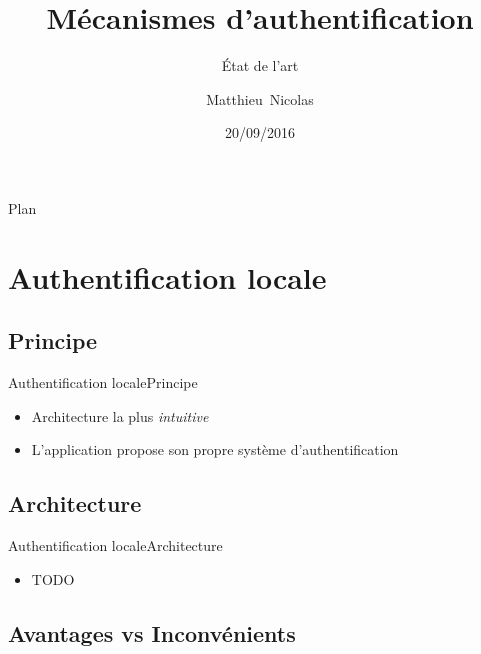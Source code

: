 \documentclass{beamer}
\title{Mécanismes d'authentification}
\subtitle{État de l'art}
\author{Matthieu~Nicolas}
\date{20/09/2016}
\begin{document}
\begin{frame}
  \titlepage
\end{frame}

\begin{frame}{Plan}
  \tableofcontents
\end{frame}

\section{Authentification locale}

\subsection{Principe}

\begin{frame}{Authentification locale}{Principe}
  \begin{center}
    \begin{itemize}
      \item Architecture la plus \emph{intuitive}
      \item L'application propose son propre système d'authentification
    \end{itemize}
  \end{center}
\end{frame}

\subsection{Architecture}

\begin{frame}{Authentification locale}{Architecture}
  \begin{itemize}
    \item TODO
  \end{itemize}
\end{frame}

\subsection{Avantages vs Inconvénients}
\end{document}
